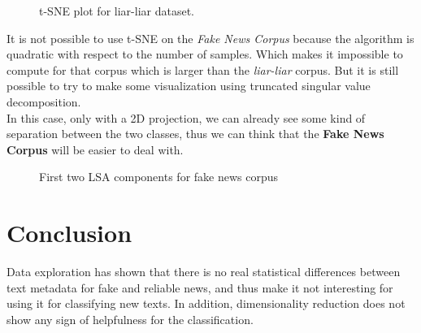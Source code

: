 \begin{figure}[h]
  \centering
  \caption{t-SNE plot for liar-liar dataset.}
  \label{fig:data_explo:tsne2}
\end{figure}
It is not possible to use t-SNE on the \textit{Fake News Corpus} because the algorithm is quadratic with respect to the number of samples. Which makes it impossible to compute for that corpus which is larger than the \textit{liar-liar} corpus. But it is still possible to try to make some visualization using truncated singular value decomposition.
\\
In this case, only with a 2D projection, we can already see some kind of separation between the two classes, thus we can think that the \textbf{Fake News Corpus} will be easier to deal with. 
\begin{figure}[h]
  \centering
  \caption{First two LSA components for fake news corpus}
  \label{fig:data_explo:LSA1}
\end{figure}
\section{Conclusion}
Data exploration has shown that there is no real statistical differences between text metadata for fake and reliable news, and thus make it not interesting for using it for classifying new texts. In addition, dimensionality reduction does not show any sign of helpfulness for the classification. 